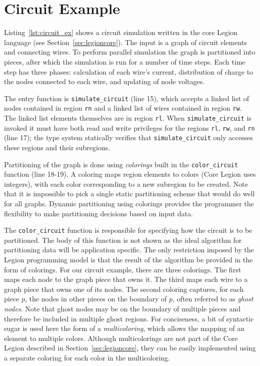 
\section{Circuit Example}
\label{sec:example}

Listing~\ref{lst:circuit_ex} shows a circuit simulation written
in the core Legion language (see
Section~\ref{sec:legioncore}).  The input is a graph of circuit
elements and connecting wires.  To perform parallel
simulation the graph is partitioned into pieces, after which the
simulation is run for a number of time steps.  Each time step has
three phases: calculation of each wire's current, distribution of charge to
the nodes connected to each wire, and updating of node voltages.

The entry function is {\tt simulate\_circuit} (line 15), which accepts a 
linked list of nodes contained in region {\tt rn} and a linked list of 
wires contained in region {\tt rw}.  The linked list elements themselves
are in region {\tt rl}.
When {\tt simulate\_circuit} is invoked it must have both read and
write privileges for the regions {\tt rl}, {\tt rw}, and {\tt rn}
(line 17); the type system statically verifies that
{\tt simulate\_circuit} only accesses these regions and their subregions.

Partitioning of the graph is done using {\em colorings} built in the
{\tt color\_circuit} function (line 18-19).  A coloring maps region
elements to colors (Core Legion uses integers), with each color corresponding
 to a new subregion
to be created.  Note that it is impossible to pick a single static
partitioning scheme that would do well for all graphs.  Dynamic
partitioning using colorings provides the programmer the flexibility
to make partitioning decisions based on input data.

The {\tt color\_circuit} function is responsible for specifying how the
circuit is to be partitioned.  The body of this function is not shown as the
ideal algorithm for partitioning data will be application specific.  The 
only restriction imposed by the Legion programming model is that the result of
the algorithm be provided in the form of colorings.  For our circuit example,
there are three colorings.  The first maps each node to the graph piece that owns it.
The third maps each wire to a graph piece that
owns one of its nodes.  The second coloring captures, for each piece $p$,
the nodes in other pieces on the boundary of $p$, often referred to as
{\em ghost nodes}.  
Note that 
ghost nodes may be on the boundary of multiple pieces and therefore be included in
multiple ghost regions.  For conciseness, a bit of syntactic sugar is used here the
form of a {\em multicoloring}, which allows the mapping of an element to multiple 
colors.  Although multicolorings are not part of the Core Legion described in 
Section~\ref{sec:legioncore}, they can be easily implemented using a separate 
coloring for each color in the multicoloring.

